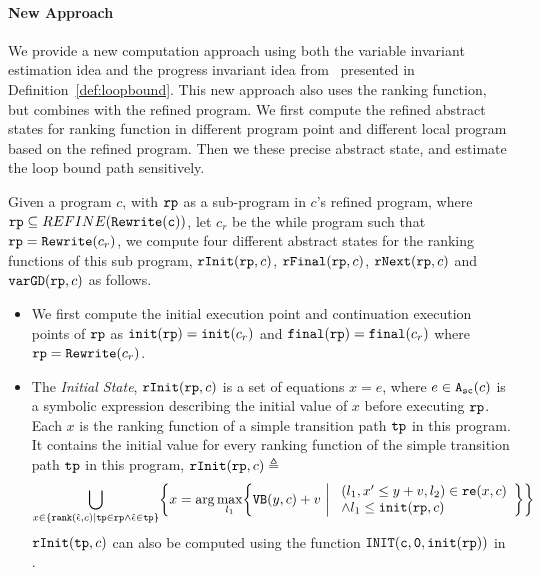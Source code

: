 \paragraph{New Approach} 
We provide a new computation approach using both the variable invariant estimation idea and the progress invariant idea from~\cite{GulwaniJK09} presented in Definition~\ref{def:loopbound}.
This new approach also uses the ranking function, but combines with the refined program.
We first compute the refined abstract states for ranking function in different program point and different local program based on the refined program.
Then we these precise abstract state, and estimate the loop bound path sensitively.

\begin{defn}
  \label{def:alg-absstate}
  Given a program $c$, with $\mathtt{rp}$ as a sub-program in $c$'s refined program, where $\mathtt{rp} \subseteq REFINE(\mathtt{Rewrite(c)})$, let $c_r$ be the while program such that $\mathtt{rp} = \mathtt{Rewrite}(c_r)$,
  we compute four different abstract states for the ranking functions of this sub program, 
  $\mathtt{rInit}(\mathtt{rp}, c)$, $\mathtt{rFinal}(\mathtt{rp}, c)$, $\mathtt{rNext}(\mathtt{rp}, c)$ and $\mathtt{varGD}(\mathtt{rp}, c)$ as follows.
 \begin{itemize}
  \item 
  We first compute the initial execution point and continuation execution points of $\mathtt{rp}$ as
  $\mathtt{init}(\mathtt{rp}) = \mathtt{init}(c_r)$
  and 
  $\mathtt{final}(\mathtt{rp}) = \mathtt{final}(c_r)$ where $\mathtt{rp} = \mathtt{Rewrite}(c_r)$.
  \item The \emph{Initial State}, 
  $\mathtt{rInit}(\mathtt{rp}, c)$ is a set of equations $x = e$, where $e \in {\ensuremath{\mathtt{A_{sc}}}}(c)$ is a
  symbolic expression describing the initial value of $x$ before executing $\mathtt{rp}$.
  Each $x$ is the ranking function of a simple transition path $\mathtt{tp}$ in this program. 
  It contains the initial value for every ranking function of the simple transition path $\mathtt{tp}$ in this program, 
  $\mathtt{rInit}(\mathtt{rp}, c) \triangleq $
  {\small
  \[
   \bigcup_{x \in \left\{ \locbound(\absevent, c) | \tpath \in \rprog \land \absevent \in \tpath \right\} }
   \left \{ 
   x = \arg\max_{l_1}\left\{
     \varinvar(y, c) + v ~\middle\vert~ 
     \begin{array}{l} 
       (l_1, x' \leq y + v, l_2) \in \reset(x, c) 
       \\
     \land l_1 \leq \absinit(\rprog, c)
   \end{array}
   \right\}
   \right\}
   \]
 }
 $\mathtt{rInit}(\mathtt{tp}, c)$ can also be computed using the function $\mathtt{INIT(c, 0, \mathtt{init}(\mathtt{rp}))}$ in \cite{GulwaniJK09}. 

\end{itemize}
\end{defn}
